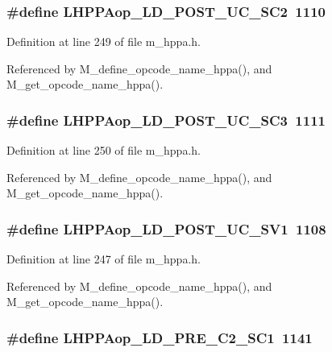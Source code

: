 \subsubsection{\setlength{\rightskip}{0pt plus 5cm}\#define LHPPAop\_\-LD\_\-POST\_\-UC\_\-SC2~1110}\label{m__hppa_8h_6ad0fff986d08a5cc5ac46d6f62697f2}




Definition at line 249 of file m\_\-hppa.h.

Referenced by M\_\-define\_\-opcode\_\-name\_\-hppa(), and M\_\-get\_\-opcode\_\-name\_\-hppa().
\subsubsection{\setlength{\rightskip}{0pt plus 5cm}\#define LHPPAop\_\-LD\_\-POST\_\-UC\_\-SC3~1111}\label{m__hppa_8h_b9b884e7991a16ec4506b7c38085271b}




Definition at line 250 of file m\_\-hppa.h.

Referenced by M\_\-define\_\-opcode\_\-name\_\-hppa(), and M\_\-get\_\-opcode\_\-name\_\-hppa().
\subsubsection{\setlength{\rightskip}{0pt plus 5cm}\#define LHPPAop\_\-LD\_\-POST\_\-UC\_\-SV1~1108}\label{m__hppa_8h_6d8a3a3d615dda0419dbde3ca8c6f2d0}




Definition at line 247 of file m\_\-hppa.h.

Referenced by M\_\-define\_\-opcode\_\-name\_\-hppa(), and M\_\-get\_\-opcode\_\-name\_\-hppa().
\subsubsection{\setlength{\rightskip}{0pt plus 5cm}\#define LHPPAop\_\-LD\_\-PRE\_\-C2\_\-SC1~1141}\label{m__hppa_8h_26f077fc688409fa8f7405c22e68ea32}




